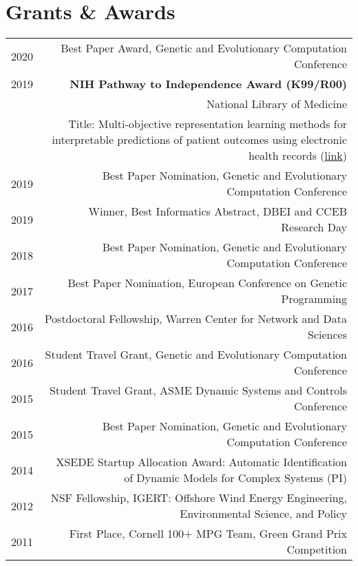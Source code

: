 \section*{Grants \& Awards}
\begin{tabular}{L!{\VRule}R}
2020& Best Paper Award, Genetic and Evolutionary Computation Conference  \\
2019& {\bf NIH Pathway to Independence Award (K99/R00) }\\
    & \hspace{1em} National Library of Medicine\\
    & \hspace{1em} Title: Multi-objective representation learning methods for interpretable predictions of patient outcomes using electronic health records 
    (\href{https://projectreporter.nih.gov/project_info_description.cfm?aid=9744166&icde=0}{link})\\
2019& Best Paper Nomination, Genetic and Evolutionary Computation Conference  \\
2019& Winner, Best Informatics Abstract, DBEI and CCEB Research Day\\
2018& Best Paper Nomination, Genetic and Evolutionary Computation Conference  \\
2017& Best Paper Nomination, European Conference on Genetic Programming  \\
2016& Postdoctoral Fellowship, Warren Center for Network and Data Sciences \\
2016& Student Travel Grant, Genetic and Evolutionary Computation Conference\\
2015& Student Travel Grant, ASME Dynamic Systems and Controls Conference \\
2015& Best Paper Nomination, Genetic and Evolutionary Computation Conference  \\
2014&XSEDE Startup Allocation Award: Automatic Identification of Dynamic Models for Complex Systems (PI) \\
2012& NSF Fellowship, IGERT: Offshore Wind Energy Engineering, Environmental Science, and Policy \\
2011& First Place, Cornell 100$+$ MPG Team, Green Grand Prix Competition \\
\end{tabular}
